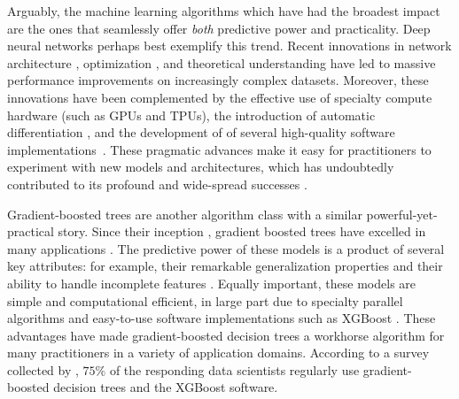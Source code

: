 Arguably, the machine learning algorithms which have had the broadest impact are the ones that seamlessly offer \emph{both} predictive power and practicality.
Deep neural networks perhaps best exemplify this trend.
Recent innovations in
network architecture \citep[e.g.][]{krizhevsky2012imagenet,he2016deep,vaswani2017attention,devlin2018bert,huang2019convolutional},
optimization \citep[e.g.][]{hochreiter1997flat,ioffe2015batch,izmailov2018averaging},
and theoretical understanding \citep[e.g.][]{keskar2016large,jacot2018neural,arora2019fine}
have led to massive performance improvements on increasingly complex datasets.
Moreover, these innovations have been complemented by
the effective use of specialty compute hardware (such as GPUs and TPUs),
the introduction of automatic differentiation \citep[e.g.][]{paszke2017automatic},
and the development of of several high-quality software implementations~\citep[e.g.][]{jia2014caffe,abadi2016tensorflow,paszke2019pytorch}.
These pragmatic advances make it easy for practitioners to experiment with new models and architectures, which has undoubtedly contributed to its profound and wide-spread successes \cite{goodfellow2016deep}.

Gradient-boosted trees are another algorithm class with a similar powerful-yet-practical story.
Since their inception \cite{friedman2001greedy,friedman2002stochastic}, gradient boosted trees have excelled in many applications \citep[e.g.][]{richardson2007predicting,burges2010ranknet,li2010robust}.
The predictive power of these models is a product of several key attributes: for example, their remarkable generalization properties \citep{freund1997decision,schapire2013boosting} and their ability to handle incomplete features \cite{friedman2001greedy}.
Equally important, these models are simple and computational efficient, in large part due to specialty parallel algorithms \citep[e.g.][]{panda2009planet,tyree2011parallel,ke2017lightgbm} and easy-to-use software implementations such as XGBoost \cite{chen2016xgboost}.
These advantages have made gradient-boosted decision trees a workhorse algorithm for many practitioners in a variety of application domains.
According to a survey collected by \citet{kaggle2019kaggle}, $75\%$ of the responding data scientists regularly use gradient-boosted decision trees and the XGBoost software.

